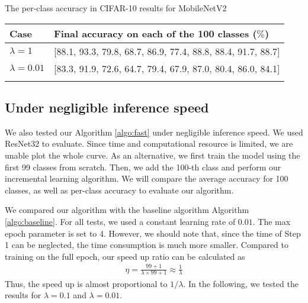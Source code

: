 \begin{table}[!hpb]
	\centering
	{The per-class accuracy in CIFAR-10 results for MobileNetV2}
	\label{tab:firstone}
	\begin{tabular}{@{}lp{10cm}@{}} \toprule
		Case &  Final accuracy on each of the 100 classes ($\%$)\\ \midrule
		$\lambda=1$  &[88.1, 93.3, 79.8, 68.7, 86.9, 77.4, 88.8, 88.4, 91.7, 88.7]
		
		\\
		$\lambda=0.01$  & [83.3, 91.9, 72.6, 64.7, 79.4, 67.9, 87.0, 80.4, 86.0, 84.1]
		\\ \bottomrule
		\label{tab:cifar10_mobilenetv2}
	\end{tabular}
\end{table}
\subsection{Under negligible inference speed}
We also tested our Algorithm \ref{algo:fast} under negligible inference speed. We used ResNet32 to evaluate. Since time and computational resource is limited, we are unable plot the whole curve. As an alternative, we first train the model using the first 99 classes from scratch. Then, we add the 100-th class and perform our incremental learning algorithm. We will compare the average accuracy for 100 classes, as well as per-class accuracy to evaluate our algorithm.

We compared our algorithm with the baseline algorithm Algorithm \ref{algo:baseline}. For all tests, we used a constant learning rate of $0.01$. The max epoch parameter is set to 4. However, we should note that, since the time of Step 1 can be neglected, the time consumption is much more smaller. Compared to training on the full epoch, our speed up ratio can be calculated as
\begin{align}
\eta = \frac{99+1}{\lambda \times 99 + 1} \approx \frac{1}{\lambda}
\end{align}
Thus, the speed up is almost proportional to $1/\lambda$. In the following, we tested the results for $\lambda=0.1$ and $\lambda=0.01$.

